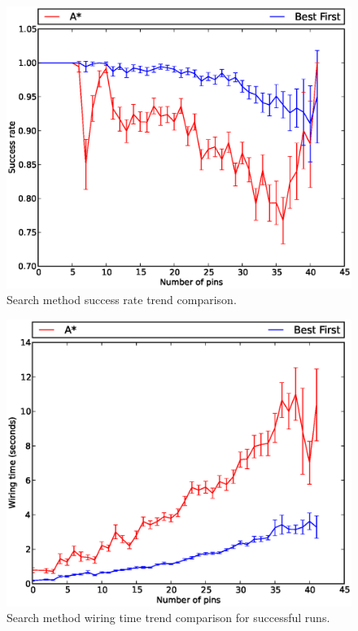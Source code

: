 \begin{figure}
\begin{center}
\includegraphics[width=\textwidth]{Images/search_success_trend_comparison.eps}
\caption[Search method success rate trend comparison]{Search method success rate
trend comparison.}
\label{fig:search_success_trend}
\end{center}
\end{figure}

\begin{figure}
\begin{center}
\includegraphics[width=\textwidth]{Images/search_time_trend_comparison.eps}
\caption[Search method wiring time trend comparison]{Search method wiring time
trend comparison for successful runs.}
\label{fig:search_time_trend}
\end{center}
\end{figure}

